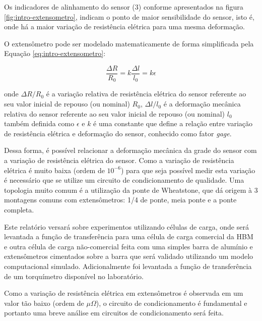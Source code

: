 \documentclass[a4paper]{instrumentacao}
\begin{document}
Os indicadores de alinhamento do sensor (3) conforme apresentados na figura \ref{fig:intro-extensometro}, indicam o ponto de maior sensibilidade do sensor, isto é, onde há a maior variação de resistência elétrica para uma mesma deformação.

O extensômetro pode ser modelado matematicamente de forma simplificada pela Equação \ref{eq:intro-extensometro}:

\begin{equation}
	\frac{\Delta R}{R_0} = k \frac{\Delta l}{l_0} = k\epsilon
	\label {eq:intro-extensometro}
\end{equation}

\noindent onde $\Delta R/R_0$ é a variação relativa de resistência elétrica do sensor referente ao seu valor inicial de repouso (ou nominal) $R_0$, $\Delta l/l_0$ é a deformação mecânica relativa do sensor referente ao seu valor inicial de repouso (ou nominal) $l_0$ também definida como $\epsilon$ e $k$ é uma constante que define a relação entre variação de resistência elétrica e deformação do sensor, conhecido como fator \textit{gage}.

Dessa forma, é possível relacionar a deformação mecânica da grade do sensor com a variação de resistência elétrica do sensor. Como a variação de resistência elétrica é muito baixa (ordem de $10^{-6}$) para que seja possível medir esta variação é necessário que se utilize um circuito de condicionamento de qualidade. Uma topologia muito comum é a utilização da ponte de Wheatstone, que dá origem à 3 montagens comuns com extensômetros: 1/4 de ponte, meia ponte e a ponte completa.

Este relatório versará sobre experimentos utilizando células de carga, onde será levantada a função de transferência para uma célula de carga comercial da HBM e outra célula de carga não-comercial feita com uma simples barra de alumínio e extensômetros cimentados sobre a barra que será validado utilizando um modelo computacional simulado. Adicionalmente foi levantada a função de transferência de um torquímetro disponível no laboratório.

Como a variação de resistência elétrica em extensômetros é observada em um valor tão baixo (ordem de $\mu\Omega$), o circuito de condicionamento é fundamental e portanto uma breve análise em circuitos de condicionamento será feita.
\end{document}
